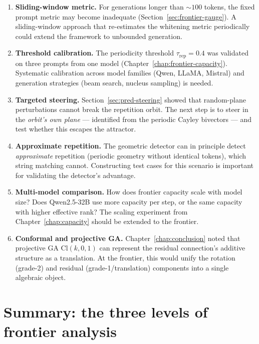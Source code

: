\documentclass[11pt, twoside, openright]{memoir}
\numberwithin{equation}{chapter}
\begin{document}
\begin{enumerate}[nosep]
\item \textbf{Sliding-window metric.}
  For generations longer than $\sim\!100$ tokens, the fixed prompt
  metric may become inadequate
  (Section~\ref{sec:frontier-gauge}).  A sliding-window approach
  that re-estimates the whitening metric periodically could extend
  the framework to unbounded generation.

\item \textbf{Threshold calibration.}
  The periodicity threshold $\tau_{\mathrm{rep}} = 0.4$ was
  validated on three prompts from one model
  (Chapter~\ref{chap:frontier-capacity}).  Systematic calibration
  across model families (Qwen, LLaMA, Mistral) and generation
  strategies (beam search, nucleus sampling) is needed.

\item \textbf{Targeted steering.}
  Section~\ref{sec:pred-steering} showed that random-plane
  perturbations cannot break the repetition orbit.  The next step
  is to steer in the \emph{orbit's own plane} --- identified from
  the periodic Cayley bivectors --- and test whether this
  escapes the attractor.

\item \textbf{Approximate repetition.}
  The geometric detector can in principle detect \emph{approximate}
  repetition (periodic geometry without identical tokens), which
  string matching cannot.  Constructing test cases for this
  scenario is important for validating the detector's advantage.

\item \textbf{Multi-model comparison.}
  How does frontier capacity scale with model size?  Does
  Qwen2.5-32B use more capacity per step, or the same capacity
  with higher effective rank?  The scaling experiment from
  Chapter~\ref{chap:capacity} should be extended to the frontier.

\item \textbf{Conformal and projective GA.}
  Chapter~\ref{chap:conclusion} noted that projective GA
  $\mathrm{Cl}(k,0,1)$ can represent the residual connection's
  additive structure as a translation.  At the frontier, this
  would unify the rotation (grade-2) and residual
  (grade-1/translation) components into a single algebraic object.
\end{enumerate}


\section{Summary: the three levels of frontier analysis}
\label{sec:pred-summary}
\end{document}
